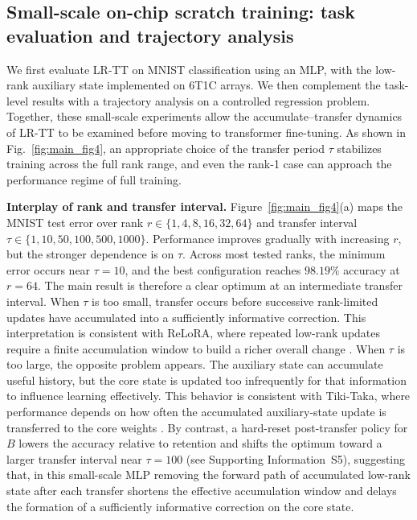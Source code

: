 \documentclass[AMA,LATO2COL]{WileyNJDv5}
\begin{document}
\subsection{\texorpdfstring{Small-scale on-chip scratch training: task evaluation and trajectory analysis}{Small-scale on-chip scratch training: task evaluation and trajectory analysis}}
\label{subsec:results_scratch}

\noindent
We first evaluate LR-TT on MNIST classification \cite{lecun1998gradient} using an MLP, with the low-rank auxiliary state implemented on 6T1C arrays. We then complement the task-level results with a trajectory analysis on a controlled regression problem. Together, these small-scale experiments allow the accumulate--transfer dynamics of LR-TT to be examined before moving to transformer fine-tuning. As shown in Fig.~\ref{fig:main_fig4}, an appropriate choice of the transfer period $\tau$ stabilizes training across the full rank range, and even the rank-1 case can approach the performance regime of full training.

\noindent\textbf{Interplay of rank and transfer interval.}
Figure~\ref{fig:main_fig4}(a) maps the MNIST test error over rank $r\in\{1,4,8,16,32,64\}$ and transfer interval $\tau\in\{1,10,50,100,500,1000\}$. Performance improves gradually with increasing $r$, but the stronger dependence is on $\tau$. Across most tested ranks, the minimum error occurs near $\tau=10$, and the best configuration reaches \(98.19\%\) accuracy at \(r=64\). The main result is therefore a clear optimum at an intermediate transfer interval. When $\tau$ is too small, transfer occurs before successive rank-limited updates have accumulated into a sufficiently informative correction. This interpretation is consistent with ReLoRA, where repeated low-rank updates require a finite accumulation window to build a richer overall change \cite{lialin2023relora}. When $\tau$ is too large, the opposite problem appears. The auxiliary state can accumulate useful history, but the core state is updated too infrequently for that information to influence learning effectively. This behavior is consistent with Tiki-Taka, where performance depends on how often the accumulated auxiliary-state update is transferred to the core weights \cite{gokmen2020tikitaka,lee2022tikitaka_asymmetry,rasch2024fastrobust}. By contrast, a hard-reset post-transfer policy for $B$ lowers the accuracy relative to retention and shifts the optimum toward a larger transfer interval near $\tau=100$ (see Supporting Information~S5), suggesting that, in this small-scale MLP removing the forward path of accumulated low-rank state after each transfer shortens the effective accumulation window and delays the formation of a sufficiently informative correction on the core state.
\end{document}

